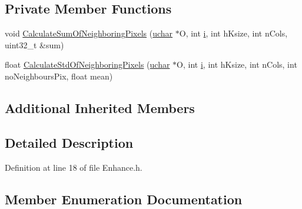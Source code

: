 \subsection*{Private Member Functions}
\begin{DoxyCompactItemize}
\item 
void \hyperlink{class_vision_1_1_enhance_a6ff043acf8f40873141ef3bb0af4994d}{Calculate\+Sum\+Of\+Neighboring\+Pixels} (\hyperlink{_soil_math_types_8h_a65f85814a8290f9797005d3b28e7e5fc}{uchar} $\ast$O, int \hyperlink{_v_s_a___u_t_2_comparision_pictures_2_createtest_image_8m_a6f6ccfcf58b31cb6412107d9d5281426}{i}, int h\+Ksize, int n\+Cols, uint32\+\_\+t \&sum)
\item 
float \hyperlink{class_vision_1_1_enhance_ac03740bd6b3cd2936a579644c9646ce0}{Calculate\+Std\+Of\+Neighboring\+Pixels} (\hyperlink{_soil_math_types_8h_a65f85814a8290f9797005d3b28e7e5fc}{uchar} $\ast$O, int \hyperlink{_v_s_a___u_t_2_comparision_pictures_2_createtest_image_8m_a6f6ccfcf58b31cb6412107d9d5281426}{i}, int h\+Ksize, int n\+Cols, int no\+Neighbours\+Pix, float mean)
\end{DoxyCompactItemize}
\subsection*{Additional Inherited Members}


\subsection{Detailed Description}


Definition at line 18 of file Enhance.\+h.



\subsection{Member Enumeration Documentation}
\hypertarget{class_vision_1_1_enhance_a36caf2ddf5cb2575bfae8bcdca04e58e}{}
